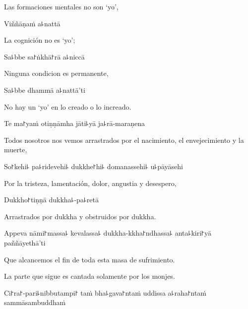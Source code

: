 \begin{english}
  Las formaciones mentales no son `yo',
\end{english}

Viññāṇaṁ a꜕nattā

\begin{english}
  La cognición no es `yo';
\end{english}

Sa꜕bbe sa꜓ṅkhā꜓rā a꜕niccā

\begin{english}
  Ninguna condicion es permanente,
\end{english}

Sa꜕bbe dhammā a꜕nattā'ti

\begin{english}
  No hay un `yo' en lo creado o lo increado.
\end{english}

\clearpage

Te ma꜓yaṁ otiṇṇāmha jāti꜕yā ja꜕rā-maraṇena

\begin{english}
  Todos nosotros nos vemos arrastrados por el nacimiento, el envejecimiento y la muerte,
\end{english}

So꜓kehi꜕ pa꜕ridevehi꜕ dukkhe꜓hi꜕ domanassehi꜕ u꜕pāyāsehi

\begin{english}
  Por la tristeza, lamentación, dolor, angustia y desespero,
\end{english}

Dukkho꜓tiṇṇā dukkha꜕-pa꜕retā

\begin{english}
  Arrastrados por dukkha y obstruidos por dukkha.
\end{english}

Appeva nāmi꜓massa꜕ kevalassa꜕ dukkha-kkha꜓ndhassa꜕ anta꜕kiri꜓yā \\paññāyethā'ti

\begin{english}
  Que alcancemos el fin de toda esta masa de sufrimiento.
\end{english}

\begin{instruction}
  La parte que sigue es cantada solamente por los monjes.
\end{instruction}

Ci꜓ra꜓-pari꜕nibbutampi꜓ taṁ bha꜕gava꜓ntaṁ uddissa a꜕raha꜓ntaṁ sammāsambuddhaṁ

